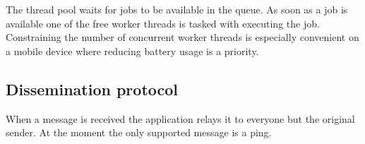 The thread pool waits for jobs to be available in the queue.
As soon as a job is available one of the free worker threads is tasked with executing the job.
Constraining the number of concurrent worker threads is especially convenient on a mobile device where reducing battery usage is a priority.

\subsection{Dissemination protocol}
When a message is received the application relays it to everyone but the original sender.
At the moment the only supported message is a ping.